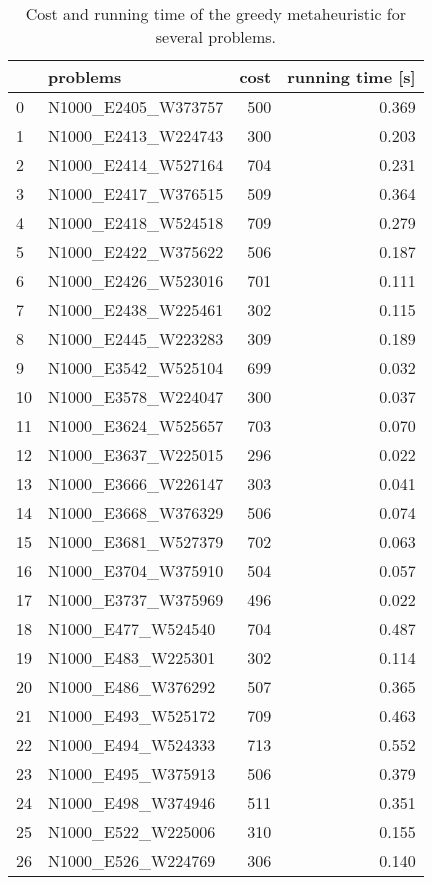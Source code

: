 \begin{table}
\centering
\begin{tabular}{llrr}
\toprule
{} &             problems &  cost &  running time [s] \\
\midrule
0  &  N1000\_E2405\_W373757 &   500 &             0.369 \\
1  &  N1000\_E2413\_W224743 &   300 &             0.203 \\
2  &  N1000\_E2414\_W527164 &   704 &             0.231 \\
3  &  N1000\_E2417\_W376515 &   509 &             0.364 \\
4  &  N1000\_E2418\_W524518 &   709 &             0.279 \\
5  &  N1000\_E2422\_W375622 &   506 &             0.187 \\
6  &  N1000\_E2426\_W523016 &   701 &             0.111 \\
7  &  N1000\_E2438\_W225461 &   302 &             0.115 \\
8  &  N1000\_E2445\_W223283 &   309 &             0.189 \\
9  &  N1000\_E3542\_W525104 &   699 &             0.032 \\
10 &  N1000\_E3578\_W224047 &   300 &             0.037 \\
11 &  N1000\_E3624\_W525657 &   703 &             0.070 \\
12 &  N1000\_E3637\_W225015 &   296 &             0.022 \\
13 &  N1000\_E3666\_W226147 &   303 &             0.041 \\
14 &  N1000\_E3668\_W376329 &   506 &             0.074 \\
15 &  N1000\_E3681\_W527379 &   702 &             0.063 \\
16 &  N1000\_E3704\_W375910 &   504 &             0.057 \\
17 &  N1000\_E3737\_W375969 &   496 &             0.022 \\
18 &   N1000\_E477\_W524540 &   704 &             0.487 \\
19 &   N1000\_E483\_W225301 &   302 &             0.114 \\
20 &   N1000\_E486\_W376292 &   507 &             0.365 \\
21 &   N1000\_E493\_W525172 &   709 &             0.463 \\
22 &   N1000\_E494\_W524333 &   713 &             0.552 \\
23 &   N1000\_E495\_W375913 &   506 &             0.379 \\
24 &   N1000\_E498\_W374946 &   511 &             0.351 \\
25 &   N1000\_E522\_W225006 &   310 &             0.155 \\
26 &   N1000\_E526\_W224769 &   306 &             0.140 \\
\bottomrule
\end{tabular}
\caption{Cost and running time of the greedy metaheuristic for several problems.}
\label{table:greedy-results}
\end{table}

